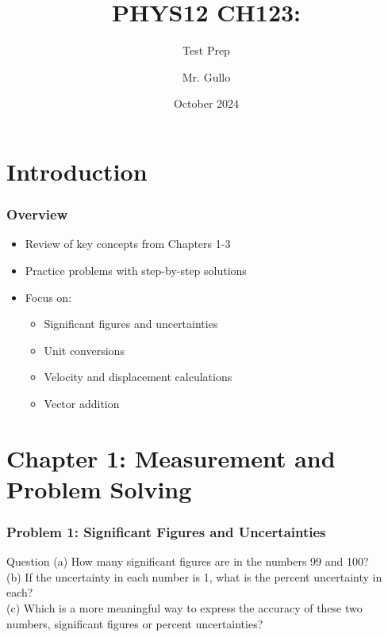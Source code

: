 \documentclass{beamer}
\title[Unit 1 Review]{PHYS12 CH123:}
\subtitle{Test Prep}
\author[Mr. Gullo]{Mr. Gullo}
\date[Oct 2024]{October 2024}
\begin{document}
\frame{\titlepage}

\section{Introduction}

\begin{frame}
\frametitle{Overview}
\begin{itemize}
    \item Review of key concepts from Chapters 1-3
    \item Practice problems with step-by-step solutions
    \item Focus on:
    \begin{itemize}
        \item Significant figures and uncertainties
        \item Unit conversions
        \item Velocity and displacement calculations
        \item Vector addition
    \end{itemize}
\end{itemize}
\end{frame}

\section{Chapter 1: Measurement and Problem Solving}
\begin{frame}
\frametitle{Problem 1: Significant Figures and Uncertainties}
\begin{block}{Question}
(a) How many significant figures are in the numbers 99 and 100?\\
(b) If the uncertainty in each number is 1, what is the percent uncertainty in each?\\
(c) Which is a more meaningful way to express the accuracy of these two numbers, significant figures or percent uncertainties?
\end{block}
\end{frame}
\end{document}
